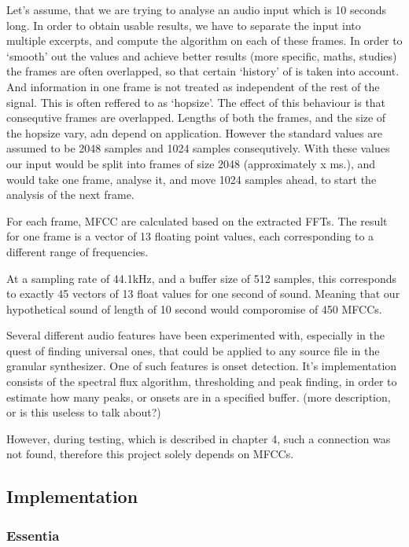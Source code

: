 Let's assume, that we are trying to analyse an audio input which is 10
seconds long. In order to obtain usable results, we have to separate
the input into multiple excerpts, and compute the algorithm on each of
these frames. In order to `smooth' out the values and achieve better
results (more specific, maths, studies) the frames are often
overlapped, so that certain `history' of is taken into account. And
information in one frame is not treated as independent of the rest of
the signal. This is often reffered to as `hopsize'. The effect of this
behaviour is that consequtive frames are overlapped. Lengths of both
the frames, and the size of the hopsize vary, adn depend on
application. However the standard values are assumed to be 2048
samples and 1024 samples consequtively. With these values our input
would be split into frames of size 2048 (approximately x ms.), and
would take one frame, analyse it, and move 1024 samples ahead, to
start the analysis of the next frame.

For each frame, MFCC are calculated based on the extracted
FFTs. The result for one frame is a vector of 13 floating point
values, each corresponding to a different range of frequencies.

At a sampling rate of 44.1kHz, and a buffer size of 512 samples, this
corresponds to exactly 45 vectors of 13 float values for one second of
sound. Meaning that our hypothetical sound of length of 10 second
would comporomise of 450 MFCCs.

Several different audio features have been experimented with,
especially in the quest of finding universal ones, that could be
applied to any source file in the granular synthesizer. One of such
features is onset detection. It's implementation consists of the
spectral flux algorithm, thresholding and peak finding, in order to
estimate how many peaks, or onsets are in a specified buffer. (more
description, or is this useless to talk about?)

However, during testing, which is described in chapter 4, such a
connection was not found, therefore this project solely depends on MFCCs.

\subsection{Implementation}
\subsubsection{Essentia}

